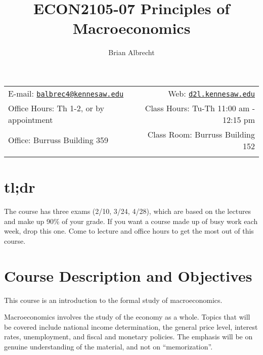 \documentclass[11pt,]{article}
\title{ECON2105-07 Principles of Macroeconomics}
\author{Brian Albrecht}
\date{}
\begin{document}
  

		\maketitle
		
	
		\thispagestyle{firststyle}



	\noindent \begin{tabular*}{\textwidth}{ @{\extracolsep{\fill}} lr @{\extracolsep{\fill}}}


E-mail: \texttt{\href{mailto:balbrec4@kennesaw.edu}{\nolinkurl{balbrec4@kennesaw.edu}}} & Web: \href{http://d2l.kennesaw.edu}{\tt d2l.kennesaw.edu}\\
Office Hours: Th 1-2, or by appointment  &  Class Hours: Tu-Th 11:00 am - 12:15 pm\\
Office: Burruss Building 359  & Class Room: Burruss Building 152\\
	&  \\
	\hline
	\end{tabular*}
	
\vspace{2mm}
	


\hypertarget{tldr}{%
\section{tl;dr}\label{tldr}}

The course has three exams (2/10, 3/24, 4/28), which are based on the lectures and make up 90\% of your grade. If you want a course made up of busy work each week, drop this one. Come to lecture and office hours to get the most out of this course.

\hypertarget{course-description-and-objectives}{%
\section*{Course Description and Objectives}\label{course-description-and-objectives}}

This course is an introduction to the formal study of macroeconomics.

Macroeconomics involves the study of the economy as a whole. Topics that will be covered include national
income determination, the general price level, interest rates, unemployment, and fiscal and monetary policies.
The emphasis will be on genuine understanding of the material, and not on ``memorization''.
\end{document}
